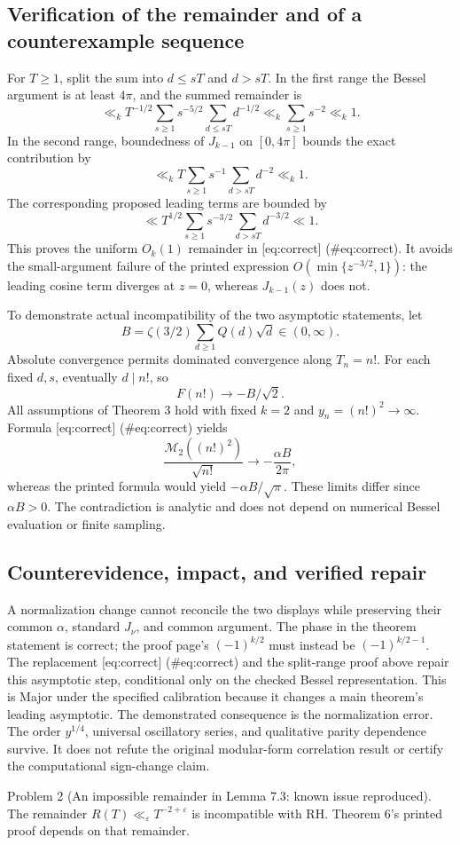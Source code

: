 \documentclass[10pt]{article}
\begin{document}
\subsection*{Verification of the remainder and of a counterexample sequence}
For \(T\ge1\), split the sum into \(d\le sT\) and \(d>sT\). In the first range the Bessel argument is at least \(4\pi\), and the summed remainder is \[\ll_k T^{-1/2}\sum_{s\ge1}s^{-5/2}
                      \sum_{d\le sT}d^{-1/2}
 \ll_k\sum_{s\ge1}s^{-2}\ll_k1.\] In the second range, boundedness of \(J_{k-1}\) on \([0,4\pi]\) bounds the exact contribution by \[\ll_k T\sum_{s\ge1}s^{-1}\sum_{d>sT}d^{-2}\ll_k1.\] The corresponding proposed leading terms are bounded by \[\ll T^{1/2}\sum_{s\ge1}s^{-3/2}\sum_{d>sT}d^{-3/2}\ll1.\] This proves the uniform \(O_k(1)\) remainder in [eq:correct] (\#eq:correct). It avoids the small-argument failure of the printed expression \(O(\min\{z^{-3/2},1\})\): the leading cosine term diverges at \(z=0\), whereas \(J_{k-1}(z)\) does not.\par
To demonstrate actual incompatibility of the two asymptotic statements, let \[B=\zeta(3/2)\sum_{d\ge1}Q(d)\sqrt d\in(0,\infty).\] Absolute convergence permits dominated convergence along \(T_n=n!\). For each fixed \(d,s\), eventually \(d\mid n!\), so \[F(n!)\longrightarrow-B/\sqrt2.\] All assumptions of Theorem 3 hold with fixed \(k=2\) and \(y_n=(n!)^2\to\infty\). Formula [eq:correct] (\#eq:correct) yields \[\frac{\mathcal M_2((n!)^2)}{\sqrt{n!}}\longrightarrow
            -\frac{\alpha B}{2\pi},\] whereas the printed formula would yield \(-\alpha B/\sqrt\pi\). These limits differ since \(\alpha B>0\). The contradiction is analytic and does not depend on numerical Bessel evaluation or finite sampling.\par
\subsection*{Counterevidence, impact, and verified repair}
A normalization change cannot reconcile the two displays while preserving their common \(\alpha\), standard \(J_\nu\), and common argument. The phase in the theorem statement is correct; the proof page’s \((-1)^{k/2}\) must instead be \((-1)^{k/2-1}\). The replacement [eq:correct] (\#eq:correct) and the split-range proof above repair this asymptotic step, conditional only on the checked Bessel representation. This is Major under the specified calibration because it changes a main theorem’s leading asymptotic. The demonstrated consequence is the normalization error. The order \(y^{1/4}\), universal oscillatory series, and qualitative parity dependence survive. It does not refute the original modular-form correlation result or certify the computational sign-change claim.\par
Problem 2 (An impossible remainder in Lemma 7.3: known issue reproduced).  The remainder \(R(T)\ll_\varepsilon T^{-2+\varepsilon}\) is incompatible with RH. Theorem 6’s printed proof depends on that remainder.\par
\end{document}
